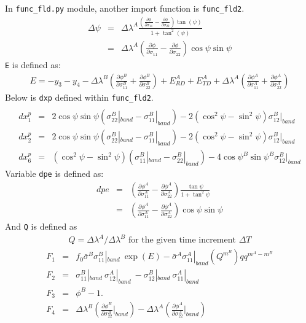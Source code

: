 \documentclass[12pt]{amsart}
\begin{document}
In \verb|func_fld.py| module, another import function is \verb|func_fld2|.
\begin{eqnarray}
  \label{eq:dpsi}
  \Delta\psi&=&\Delta{\lambda}^A \frac{ (\frac{\partial \phi}{\partial\sigma_{11}}-\frac{\partial \phi}{\partial\sigma_{22}}) \tan(\psi)}    {1+\tan^2(\psi)}\\
            &=&\Delta{\lambda}^A (\frac{\partial \phi}{\partial\sigma_{11}}-\frac{\partial \phi}{\partial\sigma_{22}}) \cos\psi \sin\psi \nonumber
\end{eqnarray}
\verb|E| is defined as:
\begin{eqnarray}
  \label{eq:yancien}
  E = -y_3 - y_4 - \Delta{\lambda}^B (\frac{\partial \phi^B}{\partial\sigma^B_{11}}+\frac{\partial \phi^B}{\partial\sigma^B_{22}})+E_{RD}^A+E_{TD}^A+\Delta\lambda^A(\frac{\partial \phi^A}{\partial\sigma^A_{11}}+\frac{\partial \phi^A}{\partial\sigma^A_{22}})
\end{eqnarray}
Below is \verb|dxp| defined within \verb|func_fld2|.
\begin{eqnarray}
  \label{eq:dxp}
  \\
  dx^p_1&=&2\cos\psi\sin\psi(\sigma_{22}^B|_{band}-\sigma_{11}^B|_{band})  - 2 (\cos^2\psi-\sin^2\psi) \sigma_{12}^B|_{band} \nonumber\\
  dx^p_2&=&2\cos\psi\sin\psi(\sigma_{22}^B|_{band}-\sigma_{11}^B|_{band})    - 2 (\cos^2\psi-\sin^2\psi) \sigma_{12}^B|_{band}\nonumber \\
  dx^p_6&=&(\cos^2\psi-\sin^2\psi) (\sigma^B_{11}|_{band}-\sigma^B_{22}|_{band}) - 4 \cos\psi^B \sin\psi^B \sigma_{12}^B|_{band}\nonumber
\end{eqnarray}
Variable \verb|dpe| is defined as:
\begin{eqnarray}
  \label{eq:dpe}
  dpe &=&(\frac{\partial \phi^A}{\partial\sigma^A_{11}}-\frac{\partial \phi^A}{\partial\sigma^A_{22}}) \frac{\tan\psi }{1+\tan^2\psi}\\
      &=&(\frac{\partial \phi^A}{\partial\sigma^A_{11}}-\frac{\partial \phi^A}{\partial\sigma^A_{22}})\cos\psi\sin\psi\nonumber
\end{eqnarray}
And \verb|Q| is defined as
\begin{eqnarray}
  \label{eq:Q}
Q = \Delta\lambda^A/\Delta\lambda^B \text{ for the given time increment } \Delta T
\end{eqnarray}
\begin{eqnarray}
  \label{eq:func2_Fi}
  F_1&=&f_0 \bar{\sigma}^B\sigma_{11}^B|_{band}\ \exp(E) - \bar{\sigma}^A \sigma_{11}^A|_{band} (Q^{m^B})qq^{m^A-m^B}\\
  F_2&=&\sigma_{11}^B|_{band}\ \sigma_{12}^A|_{band}\ -\sigma_{12}^B|_{band}\ \sigma_{11}^A|_{band}\nonumber\\
  F_3&=&\phi^B-1.\nonumber \\
  F_4&=&\Delta\lambda^B (\frac{\partial \phi^B}{\partial\sigma^B_{22}}|_{band}) - \Delta\lambda^A (\frac{\partial \phi^A}{\partial\sigma^A_{22}}|_{band})\nonumber
\end{eqnarray}
\end{document}
